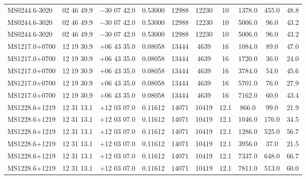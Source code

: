 \begin{landscape}
\begin{center}
\begin{longtable}{l c c c c c c c c c}
MS0244.6-3020  &           02 46 49.9  &         $-$30 07 42.0  &       0.53000  & 12988  &   12230  &      10  &        1378.0  &  455.0  &  48.8  \\
MS0244.6-3020  &           02 46 49.9  &         $-$30 07 42.0  &       0.53000  & 12988  &   12230  &      10  &        5006.0  &  96.0  &   43.2  \\
MS0244.6-3020  &           02 46 49.9  &         $-$30 07 42.0  &       0.53000  & 12988  &   12230  &      10  &        5006.0  &  96.0  &   43.2  \\
MS1217.0+0700  &           12 19 30.9  &         $+$06 43 35.0  &       0.08058  & 13444  &   4639  &       16  &        1084.0  &  89.0  &   47.0  \\
MS1217.0+0700  &           12 19 30.9  &         $+$06 43 35.0  &       0.08058  & 13444  &   4639  &       16  &        1720.0  &  36.0  &   24.0  \\
MS1217.0+0700  &           12 19 30.9  &         $+$06 43 35.0  &       0.08058  & 13444  &   4639  &       16  &        3784.0  &  54.0  &   45.6  \\
MS1217.0+0700  &           12 19 30.9  &         $+$06 43 35.0  &       0.08058  & 13444  &   4639  &       16  &        5701.0  &  76.0  &   27.9  \\
MS1217.0+0700  &           12 19 30.9  &         $+$06 43 35.0  &       0.08058  & 13444  &   4639  &       16  &        7162.0  &  60.0  &   43.4  \\
MS1228.6+1219  &           12 31 13.1  &         $+$12 03 07.0  &       0.11612  & 14071  &   10419  &      12.1  &      866.0  &   99.0  &   21.9  \\
MS1228.6+1219  &           12 31 13.1  &         $+$12 03 07.0  &       0.11612  & 14071  &   10419  &      12.1  &      1046.0  &  176.0  &  34.5  \\
MS1228.6+1219  &           12 31 13.1  &         $+$12 03 07.0  &       0.11612  & 14071  &   10419  &      12.1  &      1286.0  &  525.0  &  56.7  \\
MS1228.6+1219  &           12 31 13.1  &         $+$12 03 07.0  &       0.11612  & 14071  &   10419  &      12.1  &      3956.0  &  37.0  &   21.5  \\
MS1228.6+1219  &           12 31 13.1  &         $+$12 03 07.0  &       0.11612  & 14071  &   10419  &      12.1  &      7337.0  &  648.0  &  66.7  \\
MS1228.6+1219  &           12 31 13.1  &         $+$12 03 07.0  &       0.11612  & 14071  &   10419  &      12.1  &      7811.0  &  513.0  &  60.0  \\

\end{longtable}
\end{center}
\end{landscape}
